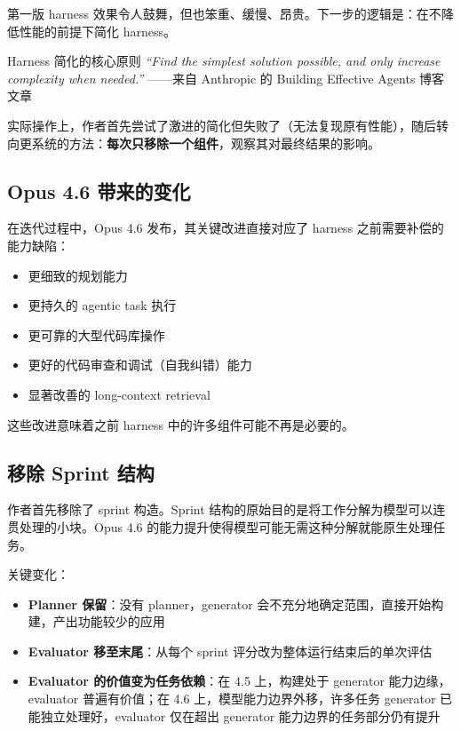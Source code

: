\documentclass[a4paper]{article}
\begin{document}
第一版 harness 效果令人鼓舞，但也笨重、缓慢、昂贵。下一步的逻辑是：在不降低性能的前提下简化 harness。

\begin{importantbox}{Harness 简化的核心原则}
\textit{``Find the simplest solution possible, and only increase complexity when needed.''} ——来自 Anthropic 的 Building Effective Agents 博客文章

实际操作上，作者首先尝试了激进的简化但失败了（无法复现原有性能），随后转向更系统的方法：\textbf{每次只移除一个组件}，观察其对最终结果的影响。
\end{importantbox}

\subsection{Opus 4.6 带来的变化}

在迭代过程中，Opus 4.6 发布，其关键改进直接对应了 harness 之前需要补偿的能力缺陷：

\begin{itemize}
    \item 更细致的规划能力
    \item 更持久的 agentic task 执行
    \item 更可靠的大型代码库操作
    \item 更好的代码审查和调试（自我纠错）能力
    \item 显著改善的 long-context retrieval
\end{itemize}

这些改进意味着之前 harness 中的许多组件可能不再是必要的。

\subsection{移除 Sprint 结构}

作者首先移除了 sprint 构造。Sprint 结构的原始目的是将工作分解为模型可以连贯处理的小块。Opus 4.6 的能力提升使得模型可能无需这种分解就能原生处理任务。

关键变化：
\begin{itemize}
    \item \textbf{Planner 保留}：没有 planner，generator 会不充分地确定范围，直接开始构建，产出功能较少的应用
    \item \textbf{Evaluator 移至末尾}：从每个 sprint 评分改为整体运行结束后的单次评估
    \item \textbf{Evaluator 的价值变为任务依赖}：在 4.5 上，构建处于 generator 能力边缘，evaluator 普遍有价值；在 4.6 上，模型能力边界外移，许多任务 generator 已能独立处理好，evaluator 仅在超出 generator 能力边界的任务部分仍有提升
\end{itemize}
\end{document}

